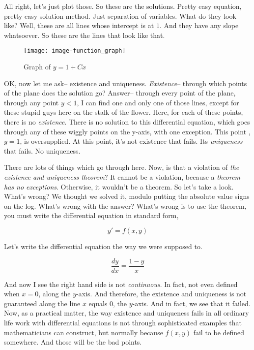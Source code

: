 All right, let's just plot those.
So these are the solutions.
Pretty easy equation, pretty easy solution method.
Just separation of variables.
What do they look like?
Well, these are all lines whose intercept is at $1$.
And they have any slope whatsoever.
So these are the lines that look like that.\\

\begin{wrapfigure}{r}{5.5cm}
  \texttt{[image: image-function\_graph]}
  \caption{Graph of $y = 1 + Cx$}
\end{wrapfigure}

OK, now let me ask-- existence and uniqueness.
\emph{Existence}-- through which points of the plane
does the solution go?
Answer-- through every point of the plane, through any point
$y < 1$, I can find one and only one of those lines,
except for these stupid guys here on the stalk of the flower.
Here, for each of these points, there is no \emph{existence}.
There is no solution to this differential equation, which
goes through any of these wiggly points on the y-axis,
with one exception.
This point ,$y = 1,\,$is oversupplied.
At this point, it's not existence that fails.
Its \emph{uniqueness} that fails. No uniqueness.

There are lots of things which go through here.
Now, is that a violation of \emph{the existence and uniqueness theorem}?
It cannot be a violation, because a \emph{theorem has no exceptions}.
Otherwise, it wouldn't be a theorem.
So let's take a look.
What's wrong? We thought we solved it, modulo putting the absolute value
signs on the log.
What's wrong with the answer?
What's wrong is to use the theorem,
you must write the differential equation in standard form,

\begin{equation*}
  y' = f(x, y)
\end{equation*}

Let's write the differential equation the way
we were supposed to.

\begin{equation*}
  \frac{dy}{dx} = \frac{1 - y}{x}
\end{equation*}

And now I see the right hand side is not \emph{continuous}.
In fact, not even defined when $x = 0$, along the $y$-axis.
And therefore, the existence and uniqueness is not guaranteed along the line $x$ equals $0$,
the $y$-axis.
And in fact, we see that it failed.
Now, as a practical matter, the way existence and uniqueness
fails in all ordinary life work with differential equations
is not through sophisticated examples
that mathematicians can construct,
but normally because $f(x,y)$ fail to be defined somewhere.
And those will be the bad points.\\

